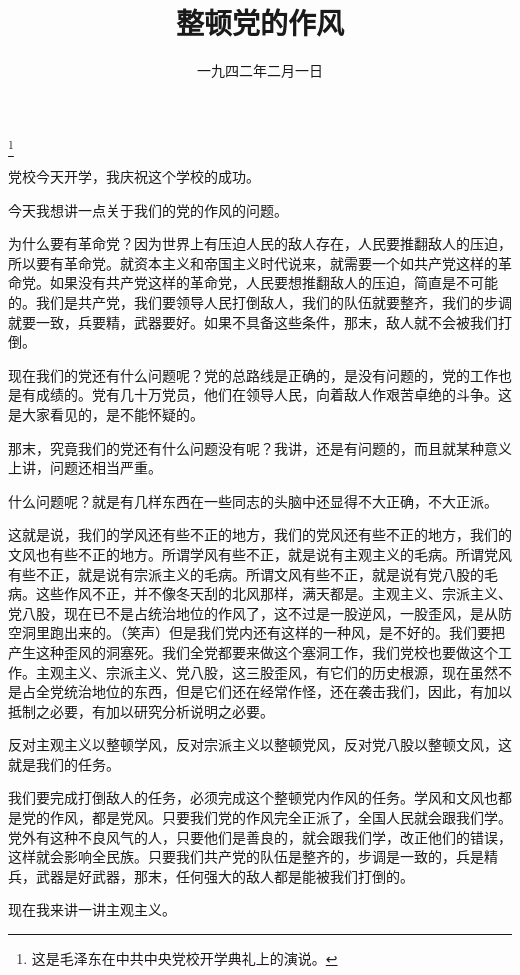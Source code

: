 
\title{整顿党的作风}
\date{一九四二年二月一日}
\thanks{这是毛泽东在中共中央党校开学典礼上的演说。}
\maketitle


党校今天开学，我庆祝这个学校的成功。

今天我想讲一点关于我们的党的作风的问题。

为什么要有革命党？因为世界上有压迫人民的敌人存在，人民要推翻敌人的压迫，所以要有革命党。就资本主义和帝国主义时代说来，就需要一个如共产党这样的革命党。如果没有共产党这样的革命党，人民要想推翻敌人的压迫，简直是不可能的。我们是共产党，我们要领导人民打倒敌人，我们的队伍就要整齐，我们的步调就要一致，兵要精，武器要好。如果不具备这些条件，那末，敌人就不会被我们打倒。

现在我们的党还有什么问题呢？党的总路线是正确的，是没有问题的，党的工作也是有成绩的。党有几十万党员，他们在领导人民，向着敌人作艰苦卓绝的斗争。这是大家看见的，是不能怀疑的。

那末，究竟我们的党还有什么问题没有呢？我讲，还是有问题的，而且就某种意义上讲，问题还相当严重。

什么问题呢？就是有几样东西在一些同志的头脑中还显得不大正确，不大正派。

这就是说，我们的学风还有些不正的地方，我们的党风还有些不正的地方，我们的文风也有些不正的地方。所谓学风有些不正，就是说有主观主义的毛病。所谓党风有些不正，就是说有宗派主义的毛病。所谓文风有些不正，就是说有党八股的毛病。这些作风不正，并不像冬天刮的北风那样，满天都是。主观主义、宗派主义、党八股，现在已不是占统治地位的作风了，这不过是一股逆风，一股歪风，是从防空洞里跑出来的。（笑声）但是我们党内还有这样的一种风，是不好的。我们要把产生这种歪风的洞塞死。我们全党都要来做这个塞洞工作，我们党校也要做这个工作。主观主义、宗派主义、党八股，这三股歪风，有它们的历史根源，现在虽然不是占全党统治地位的东西，但是它们还在经常作怪，还在袭击我们，因此，有加以抵制之必要，有加以研究分析说明之必要。

反对主观主义以整顿学风，反对宗派主义以整顿党风，反对党八股以整顿文风，这就是我们的任务。

我们要完成打倒敌人的任务，必须完成这个整顿党内作风的任务。学风和文风也都是党的作风，都是党风。只要我们党的作风完全正派了，全国人民就会跟我们学。党外有这种不良风气的人，只要他们是善良的，就会跟我们学，改正他们的错误，这样就会影响全民族。只要我们共产党的队伍是整齐的，步调是一致的，兵是精兵，武器是好武器，那末，任何强大的敌人都是能被我们打倒的。

现在我来讲一讲主观主义。

